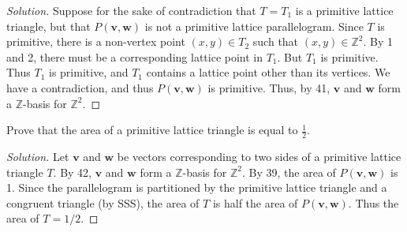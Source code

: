 \documentclass[12pt]{article}
\newenvironment{exercise}[2][Exercise]{\begin{trivlist}
        \item[\hskip \labelsep {\bfseries #1}\hskip \labelsep {\bfseries #2.}]}{\end{trivlist}}
\newenvironment{solution}
        {\begin{proof}[Solution]}
                    {\end{proof}}
\begin{document}
\begin{exercise}{42}
\begin{solution}
        Suppose for the sake of contradiction that \( T = T_{1} \) is a primitive lattice triangle, but that \( P(\mathbf{v} , \mathbf{w}) \) is not a primitive lattice parallelogram. Since \( T \) is primitive, there is a non-vertex point \( (x, y) \in T_{2} \) such that \( (x,y) \in \mathbb{Z}^{2} . \) By 1 and 2, there must be a corresponding lattice point in \( T_{1} . \) But \( T_{1} \) is primitive. Thus \( T_{1} \) is primitive, and \( T_{1} \) contains a lattice point other than its vertices. We have a contradiction, and thus \( P(\mathbf{v} , \mathbf{w}) \) is primitive. Thus, by 41, \( \mathbf{v} \) and \( \mathbf{w} \) form a \( \mathbb{Z} \)-basis for \( \mathbb{Z}^{2} . \)

    \end{solution}
\end{exercise}

\begin{exercise}{43}
    Prove that the area of a primitive lattice triangle is equal to \( \frac{1}{2} . \)
    \begin{solution}
        Let \( \mathbf{v} \) and \( \mathbf{w} \) be vectors corresponding to two sides of a primitive lattice triangle \( T. \) By 42, \( \mathbf{v} \) and \( \mathbf{w} \) form a \( \mathbb{Z} \)-basis for \( \mathbb{Z}^{2} . \) By 39, the area of \( P(\mathbf{v} , \mathbf{w}) \) is 1. Since the parallelogram is partitioned by the primitive lattice triangle and a congruent triangle (by SSS), the area of \( T \) is half the area of \( P(\mathbf{v} , \mathbf{w}) . \) Thus the area of \( T = 1/2. \)
    \end{solution}
\end{exercise}
\end{document}
